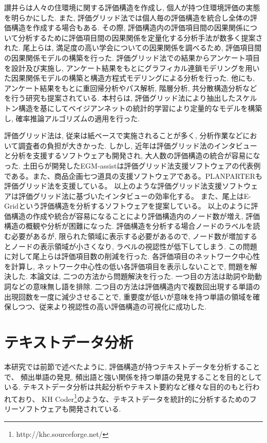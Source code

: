 \documentclass[syuuron]{kuee}
\begin{document}
		讃井らは人々の住環境に関する評価構造を作成し, 個人が持つ住環境評価の実態を明らかにした. 
		また, 評価グリッド法では個人毎の評価構造を統合し全体の評価構造を作成する場合もある. 
		その際, 評価構造内の評価項目間の因果関係について分析するために評価項目間の因果関係を定量化する分析手法が数多く提案された. 
		尾上らは, 満足度の高い学会についての因果関係を調べるため, 評価項目間の因果関係モデルの構築を行った\cite{egm8}. 
		評価グリッド法での結果からアンケート項目を設計及び実施し, アンケート結果をもとにグラフィカル連鎖モデリングを用いた因果関係モデルの構築と構造方程式モデリングによる分析を行った. 
		他にも, アンケート結果をもとに重回帰分析やパス解析, 階層分析, 共分散構造分析などを行う研究も提案されている. 
		本村らは, 評価グリッド法により抽出したスケルトン構造を基にしてベイジアンネットの統計的学習により定量的なモデルを構築し, 確率推論アルゴリズムの適用を行った\cite{egm9}. 
		
		評価グリッド法は, 従来は紙ベースで実施されることが多く, 分析作業などにおいて調査者の負担が大きかった. 
		しかし, 近年は評価グリッド法のインタビューと分析を支援するソフトウェアも開発され, 大人数の評価構造の統合が容易になった. 
		土田らが開発したEGM-assistは評価グリッド法支援ソフトウェアの代表例である。また、商品企画七つ道具の支援ソフトウェアである。PLANPARTERも評価グリッド法を支援している。
		以上のような評価グリッド法支援ソフトウェアは評価グリッド法に基づいたインタビューの効率化する。
		また、尾上はE-Gridという評価構造を分析するソフトウェアを提案している。
		以上のように評価構造の作成や統合が容易になることにより評価構造内のノード数が増え, 評価構造の概観や分析が困難になった. 
		評価構造を分析する場合ノードのラベルを読む必要があるが, 限られた領域に表示する必要があるので, 
		ノード数が増加するとノードの表示領域が小さくなり, ラベルの視認性が低下してしまう. 
		この問題に対して尾上らは評価項目数の削減を行った\cite{net1}. 
		各評価項目のネットワーク中心性を計算し, ネットワーク中心性の低い各評価項目を表示しないことで, 問題を解決した. 
		本論文は, 二つの方法から問題解決を行った. 
		一つ目の方法は助詞や助動詞などの意味無し語を排除. 二つ目の方法は評価構造内で複数回出現する単語の出現回数を一度に減少させることで, 
		重要度が低いが意味を持つ単語の領域を確保しつつ、従来より視認性の高い評価構造の可視化に成功した. 
		
	\section{テキストデータ分析}
		本研究では前節で述べたように, 評価構造が持つテキストデータを分析することで、
		頻出単語の発見, 頻出語と強い関係を持つ単語の発見することを目的としている.  
		テキストデータ分析は共起分析やテキスト要約など様々な目的のもと行われており、
		KH Coder\footnote{http://khc.sourceforge.net/}のような、テキストデータを統計的に分析するためのフリーソフトウェアも開発されている. 
		
\end{document}
